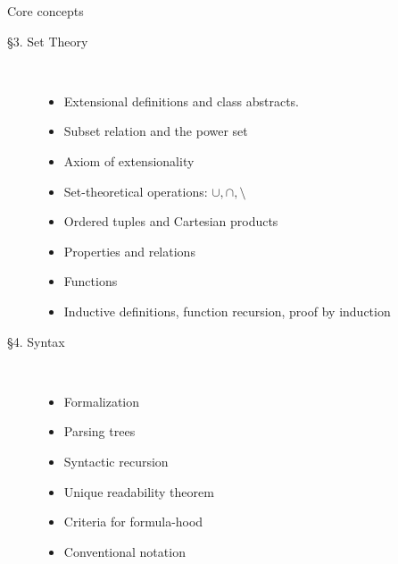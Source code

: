 \documentclass[../slides.tex]{subfiles}
\begin{document}
\begin{frame}{Core concepts}

	\begin{description}
	
		\item[\S3. Set Theory] \
		
			\begin{itemize}
			
				\item Extensional definitions and class abstracts.
				
				\item Subset relation and the power set
				
				\item Axiom of extensionality
				
				\item Set-theoretical operations: $\cup,\cap,\setminus$
				
				\item Ordered tuples and Cartesian products
				
				\item Properties and relations
				
				\item Functions
				
				\item Inductive definitions, function recursion, proof by induction
			
			\end{itemize}
	
		\item[\S4. Syntax] \
		
			\begin{itemize}
													
				\item Formalization
				
				\item Parsing trees
				
				\item Syntactic recursion
				
				\item Unique readability theorem
				
				\item Criteria for formula-hood
			
				\item Conventional notation
			
			\end{itemize}
	
	\end{description}

\end{frame}
\end{document}
